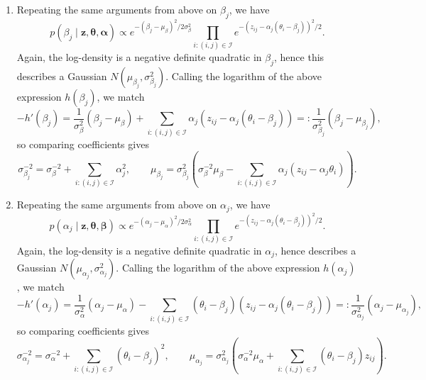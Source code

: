 \documentclass[12pt]{article}
\begin{document}
\begin{enumerate}[label=(\alph*)]
    \item Repeating the same arguments from above on $\beta_j$, we have \[
        p(\beta_j \mid \bm{z}, \bm{\theta}, \bm{\alpha})
            \propto e^{-(\beta_j - \mu_\beta)^2 / 2\sigma_\beta^2} \prod_{i: (i, j) \in \mathscr{I}} e^{-(z_{ij} - \alpha_j(\theta_i - \beta_j))^2 / 2}.
    \] Again, the log-density is a negative definite quadratic in $\beta_j$,
    hence this describes a Gaussian $N(\mu_{\beta_j}, \sigma_{\beta_j}^2)$.
    Calling the logarithm of the above expression $h(\beta_j)$, we match \[
        -h'(\beta_j)
            = \frac{1}{\sigma_\beta^2}(\beta_j - \mu_\beta) + \sum_{i: (i, j) \in \mathscr{I}} \alpha_j(z_{ij} - \alpha_j(\theta_i - \beta_j))
            =: \frac{1}{\sigma_{\beta_j}^2}(\beta_j - \mu_{\beta_j}),
    \] so comparing coefficients gives \[
        \sigma_{\beta_j}^{-2} = \sigma_{\beta}^{-2} + \sum_{i: (i, j) \in \mathscr{I}} \alpha_j^2, \qquad
        \mu_{\beta_j} = \sigma_{\beta_j}^2\left(\sigma_{\beta}^{-2}\mu_\beta - \sum_{i: (i, j) \in \mathscr{I}} \alpha_j(z_{ij} - \alpha_j\theta_i)\right).
    \] 


    \item Repeating the same arguments from above on $\alpha_j$, we have \[
        p(\alpha_j \mid \bm{z}, \bm{\theta}, \bm{\beta})
            \propto e^{-(\alpha_j - \mu_\alpha)^2 / 2\sigma_\alpha^2} \prod_{i: (i, j) \in \mathscr{I}} e^{-(z_{ij} - \alpha_j(\theta_i - \beta_j))^2 / 2}.
    \] Again, the log-density is a negative definite quadratic in $\alpha_j$,
    hence describes a Gaussian $N(\mu_{\alpha_j}, \sigma_{\alpha_j}^2)$.
    Calling the logarithm of the above expression $h(\alpha_j)$, we match \[
        -h'(\alpha_j)
            = \frac{1}{\sigma_\alpha^2}(\alpha_j - \mu_\alpha) - \sum_{i: (i, j) \in \mathscr{I}} (\theta_i - \beta_j)(z_{ij} - \alpha_j(\theta_i - \beta_j))
            =: \frac{1}{\sigma_{\alpha_j}^2}(\alpha_j - \mu_{\alpha_j}),
    \] so comparing coefficients gives \[
        \sigma_{\alpha_j}^{-2} = \sigma_{\alpha}^{-2} + \sum_{i: (i, j) \in \mathscr{I}} (\theta_i - \beta_j)^2, \qquad
        \mu_{\alpha_j} = \sigma_{\alpha_j}^2\left(\sigma_{\alpha}^{-2}\mu_\alpha + \sum_{i: (i, j) \in \mathscr{I}} (\theta_i - \beta_j)z_{ij}\right).
    \] 


\end{enumerate}
\end{document}
